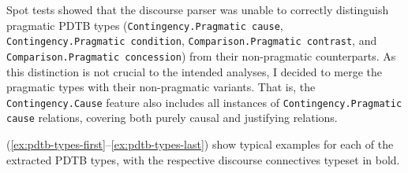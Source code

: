 \documentclass[
    a4paper,%
    12pt,%
    oneside,%
    toc=bibliography,
    final,
]{scrartcl}
\begin{document}

\begin{sloppypar}
Spot tests showed that the discourse parser was unable to correctly distinguish pragmatic PDTB types (\lstinline|Contingency.Pragmatic cause|, \lstinline|Contingency.Pragmatic condition|, \lstinline|Comparison.Pragmatic contrast|, and \lstinline|Comparison.Pragmatic concession|) from their non-pragmatic counterparts. As this distinction is not crucial to the intended analyses, I decided to merge the pragmatic types with their non-pragmatic variants. That is, the \lstinline|Contingency.Cause| feature also includes all instances of \lstinline|Contingency.Pragmatic cause| relations, covering both purely causal and justifying relations.
\end{sloppypar}

(\ref{ex:pdtb-types-first}–\ref{ex:pdtb-types-last}) show typical examples for each of the extracted PDTB types, with the respective discourse connectives typeset in bold.
\end{document}
